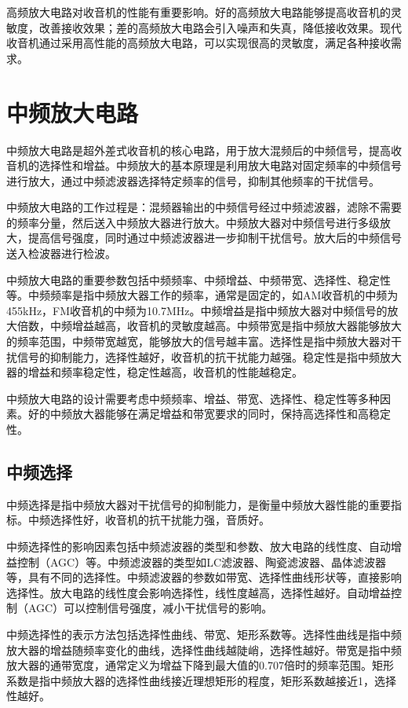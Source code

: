 \documentclass[12pt,UTF8]{ctexbook}
\begin{document}
高频放大电路对收音机的性能有重要影响。好的高频放大电路能够提高收音机的灵敏度，改善接收效果；差的高频放大电路会引入噪声和失真，降低接收效果。现代收音机通过采用高性能的高频放大电路，可以实现很高的灵敏度，满足各种接收需求。

\section{中频放大电路}

中频放大电路是超外差式收音机的核心电路，用于放大混频后的中频信号，提高收音机的选择性和增益。中频放大的基本原理是利用放大电路对固定频率的中频信号进行放大，通过中频滤波器选择特定频率的信号，抑制其他频率的干扰信号。

中频放大电路的工作过程是：混频器输出的中频信号经过中频滤波器，滤除不需要的频率分量，然后送入中频放大器进行放大。中频放大器对中频信号进行多级放大，提高信号强度，同时通过中频滤波器进一步抑制干扰信号。放大后的中频信号送入检波器进行检波。

中频放大电路的重要参数包括中频频率、中频增益、中频带宽、选择性、稳定性等。中频频率是指中频放大器工作的频率，通常是固定的，如AM收音机的中频为455kHz，FM收音机的中频为10.7MHz。中频增益是指中频放大器对中频信号的放大倍数，中频增益越高，收音机的灵敏度越高。中频带宽是指中频放大器能够放大的频率范围，中频带宽越宽，能够放大的信号越丰富。选择性是指中频放大器对干扰信号的抑制能力，选择性越好，收音机的抗干扰能力越强。稳定性是指中频放大器的增益和频率稳定性，稳定性越高，收音机的性能越稳定。

中频放大电路的设计需要考虑中频频率、增益、带宽、选择性、稳定性等多种因素。好的中频放大器能够在满足增益和带宽要求的同时，保持高选择性和高稳定性。

\subsection{中频选择}

中频选择是指中频放大器对干扰信号的抑制能力，是衡量中频放大器性能的重要指标。中频选择性好，收音机的抗干扰能力强，音质好。

中频选择性的影响因素包括中频滤波器的类型和参数、放大电路的线性度、自动增益控制（AGC）等。中频滤波器的类型如LC滤波器、陶瓷滤波器、晶体滤波器等，具有不同的选择性。中频滤波器的参数如带宽、选择性曲线形状等，直接影响选择性。放大电路的线性度会影响选择性，线性度越高，选择性越好。自动增益控制（AGC）可以控制信号强度，减小干扰信号的影响。

中频选择性的表示方法包括选择性曲线、带宽、矩形系数等。选择性曲线是指中频放大器的增益随频率变化的曲线，选择性曲线越陡峭，选择性越好。带宽是指中频放大器的通带宽度，通常定义为增益下降到最大值的0.707倍时的频率范围。矩形系数是指中频放大器的选择性曲线接近理想矩形的程度，矩形系数越接近1，选择性越好。
\end{document}
